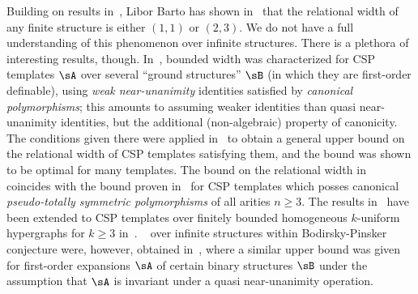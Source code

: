 Building on results in~\cite{FederVardi,DalmauPearson,BartoKozikBoundedWidth}, Libor Barto has shown in~\cite{BartoCollapse} that the  relational width of any finite structure is either $(1,1)$ or $(2,3)$. We do not have a full understanding of this phenomenon over infinite structures. There is a plethora of interesting results, though.    
In~\cite{SmoothApproximations}, bounded width was characterized for CSP templates $\sA$ over several ``ground structures'' $\sB$ (in which they are first-order definable), using \emph{weak near-unanimity} identities satisfied by \emph{canonical polymorphisms}; this amounts to assuming weaker identities than quasi near-unanimity identities, but the additional (non-algebraic) property of canonicity.
The conditions given there were applied  in~\cite{SymmetriesEnough} to obtain a general  upper bound on the relational width of CSP templates satisfying them, and the bound was shown to be optimal for many templates. The bound on the relational width in~ coincides with the bound proven in~\cite{SymmetriesEnough} for CSP templates which posses canonical \emph{pseudo-totally symmetric polymorphisms} of all arities $n\geq 3$. %
The results in~\cite{SymmetriesEnough} have been extended to CSP templates over finitely bounded homogeneous $k$-uniform hypergraphs for  $k\geq 3$ in~\cite{hypergraphs}.
~ over infinite structures within Bodirsky-Pinsker conjecture were, however, obtained in~\cite{Wrona:2020a,Wrona:2020b}, where a similar upper bound was given for first-order expansions $\sA$ of certain binary structures $\sB$  under the assumption that $\sA$ is invariant under  a quasi near-unanimity operation.%

